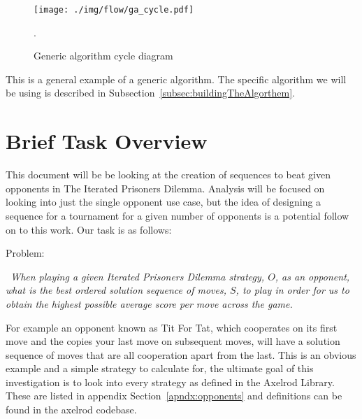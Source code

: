 \begin{figure}[ht]
    \centering
    \texttt{[image: ./img/flow/ga\_cycle.pdf]}
    \caption{Generic algorithm cycle diagram}.\label{fig:genericGeneticAlgoCycle} 
\end{figure}
This is a general example of a generic algorithm.
The specific algorithm we will be using is described in Subsection~\ref{subsec:buildingTheAlgorthem}.

\section{Brief Task Overview}\label{sec:briefOverview}
This document will be be looking at the creation of sequences to beat given opponents in The Iterated Prisoners Dilemma.
Analysis will be focused on looking into just the single opponent use case, but the idea of designing a sequence for a tournament for a given number of opponents is a potential follow on to this work.
Our task is as follows:

Problem:
\begin{center}
    \itshape~When playing a given Iterated Prisoners Dilemma strategy, \(O\), as an opponent, what is the best ordered solution sequence of moves, \(S\), to play in order for us to obtain the highest possible average score per move across the game.
\end{center}

For example an opponent known as Tit For Tat, which cooperates on its first move and the copies your last move on subsequent moves, will have a solution sequence of moves that are all cooperation apart from the last.
This is an obvious example and a simple strategy to calculate for, the ultimate goal of this investigation is to look into every strategy as defined in the Axelrod Library.
These are listed in appendix Section~\ref{apndx:opponents} and definitions can be found in the axelrod codebase\cite{axelrodproject}.
